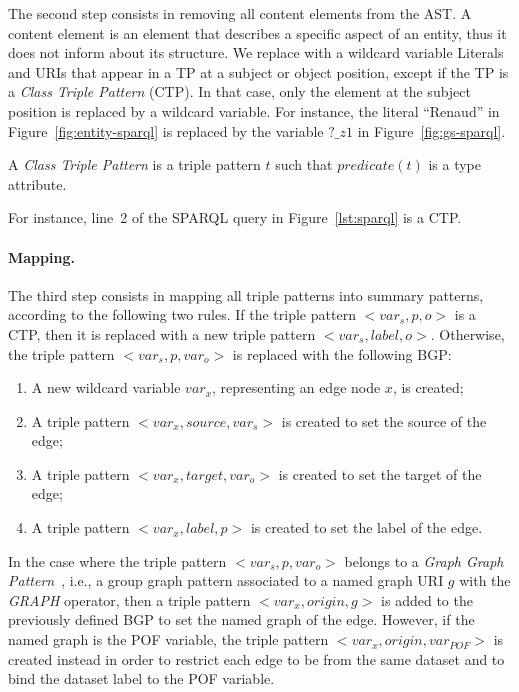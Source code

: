 The second step consists in removing all content elements from the AST. A content element is an element that describes a specific aspect of an entity, thus it does not inform about its structure. We replace with a wildcard variable Literals and URIs that appear in a TP at a subject or object position, except if the TP is a \emph{Class Triple Pattern} (CTP). In that case, only the element at the subject position is replaced by a wildcard variable. For instance, the literal ``Renaud'' in Figure~\ref{fig:entity-sparql} is replaced by the variable $?\_z1$ in Figure~\ref{fig:gs-sparql}.

\begin{definition}
A \emph{Class Triple Pattern} is a triple pattern $t$ such that $predicate(t)$ is a type attribute.
\label{def:class-triple-pattern}
\end{definition}

For instance, line~2 of the SPARQL query in Figure~\ref{lst:sparql} is a CTP.

\paragraph{Mapping.}

The third step consists in mapping all triple patterns into summary patterns, according to the following two rules. If the triple pattern $<var_s, p, o>$ is a CTP, then it is replaced with a new triple pattern \mbox{$<var_s, label, o>$}. Otherwise, the triple pattern \mbox{$<var_s, p, var_o>$} is replaced with the following BGP:

\begin{enumerate}
    \item A new wildcard variable $var_x$, representing an edge node $x$, is created;
    \item A triple pattern $<var_x, source, var_s>$ is created to set the source of the edge;
    \item A triple pattern $<var_x, target, var_o>$ is created to set the target of the edge;
    \item A triple pattern $<var_x, label, p>$ is created to set the label of the edge.
\end{enumerate}

In the case where the triple pattern $<var_s, p, var_o>$ belongs to a \emph{Graph Graph Pattern}~\cite{PrudS08}, i.e., a group graph pattern associated to a named graph URI $g$ with the \emph{GRAPH} operator, then a triple pattern $<var_x, origin, g>$ is added to the previously defined BGP to set the named graph of the edge. However, if the named graph is the POF variable, the triple pattern $<var_x, origin, var_{POF}>$ is created instead in order to restrict each edge to be from the same dataset and to bind the dataset label to the POF variable.

